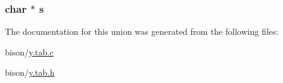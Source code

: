 \subsubsection[{\texorpdfstring{s}{s}}]{\setlength{\rightskip}{0pt plus 5cm}char $\ast$ s}\hypertarget{union_y_y_s_t_y_p_e_a506da415c9307c897ca9be93acfe1d0f}{}\label{union_y_y_s_t_y_p_e_a506da415c9307c897ca9be93acfe1d0f}


The documentation for this union was generated from the following files\+:\begin{DoxyCompactItemize}
\item 
bison/\hyperlink{y_8tab_8c}{y.\+tab.\+c}\item 
bison/\hyperlink{y_8tab_8h}{y.\+tab.\+h}\end{DoxyCompactItemize}
